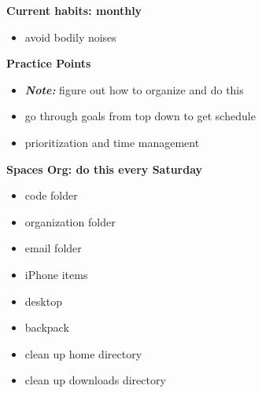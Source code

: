 \textbf{Current habits: monthly}\\
\begin{itemize}
\item avoid bodily noises
\end{itemize}

\textbf{Practice Points}\\
\begin{itemize}
\item \textit{\textbf{Note:}} figure out how to organize and do this
\item go through goals from top down to get schedule
\item prioritization and time management
\end{itemize}

\textbf{Spaces Org: do this every Saturday }
\begin{itemize}
\item code folder
\item organization folder
\item email folder
\item iPhone items
\item desktop
\item backpack
\item clean up home directory
\item clean up downloads directory
\end{itemize}

